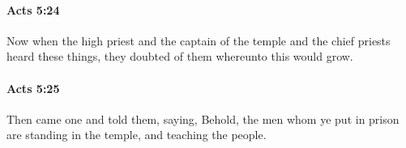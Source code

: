 		\paragraph{Acts 5:24} %
			\label{ACTS-5-24}

			Now when the high priest and the captain of the temple and the chief priests heard these things, they doubted of them whereunto this would grow.

			\begin{framed}
			\scriptsize
				\begin{compactdesc}
					\item[SBLG] 
				\end{compactdesc}
			\end{framed}

		\paragraph{Acts 5:25} %
			\label{ACTS-5-25}

			Then came one and told them, saying, Behold, the men whom ye put in prison are standing in the temple, and teaching the people.

